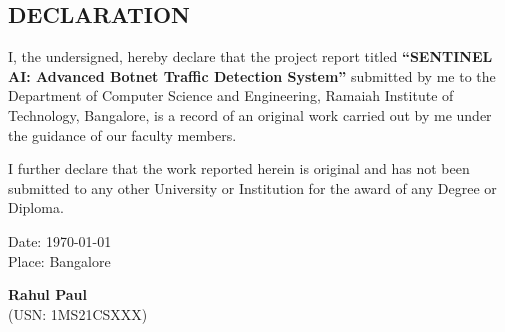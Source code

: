\newpage
\begin{center}
    \section*{DECLARATION}
\end{center}

\vspace{0.5in}

I, the undersigned, hereby declare that the project report titled \textbf{``SENTINEL AI: Advanced Botnet Traffic Detection System''} submitted by me to the Department of Computer Science and Engineering, Ramaiah Institute of Technology, Bangalore, is a record of an original work carried out by me under the guidance of our faculty members.

\vspace{0.2in}

I further declare that the work reported herein is original and has not been submitted to any other University or Institution for the award of any Degree or Diploma.

\vspace{1.0in}

\begin{flushleft}
    Date: \today \\
    Place: Bangalore
\end{flushleft}

\vspace{-0.4in}

\begin{flushright}
    \textbf{Rahul Paul} \\
    (USN: 1MS21CSXXX)
\end{flushright}
